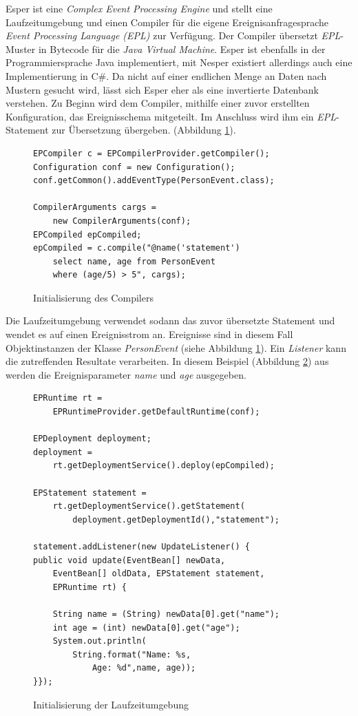 \documentclass{acm_proc_article-sp}
\begin{document}
Esper ist eine \textit{Complex Event Processing Engine} und stellt eine Laufzeitumgebung 
und einen Compiler für die eigene Ereignisanfragesprache \textit{Event Processing 
Language (EPL)} zur Verfügung. Der Compiler übersetzt \textit{EPL}-Muster in Bytecode für 
die 
\textit{Java Virtual Machine}. Esper ist ebenfalls in der Programmiersprache Java 
implementiert, mit Nesper existiert allerdings auch eine Implementierung in C\#. Da nicht 
auf einer endlichen Menge an Daten nach Mustern gesucht wird, lässt sich Esper eher als 
eine invertierte Datenbank verstehen. Zu Beginn wird dem Compiler, mithilfe einer 
zuvor erstellten Konfiguration, das Ereignisschema mitgeteilt. Im Anschluss wird ihm ein 
\textit{EPL}-Statement zur Übersetzung übergeben. (Abbildung 
\ref{java:01}). 

\begin{figure}[H]    
\begin{verbatim}
EPCompiler c = EPCompilerProvider.getCompiler();
Configuration conf = new Configuration();
conf.getCommon().addEventType(PersonEvent.class);

CompilerArguments cargs = 
    new CompilerArguments(conf);
EPCompiled epCompiled;
epCompiled = c.compile("@name('statement')
    select name, age from PersonEvent
    where (age/5) > 5", cargs);
\end{verbatim}

\caption{Initialisierung des Compilers}
\label{java:01}
\end{figure}

Die Laufzeitumgebung verwendet sodann das zuvor übersetzte Statement und wendet es auf 
einen Ereignisstrom an. Ereignisse sind in diesem Fall Objektinstanzen der Klasse 
\emph{PersonEvent} (siehe Abbildung \ref{java:01}). Ein \textit{Listener} kann die 
zutreffenden Resultate verarbeiten. In 
diesem Beispiel (Abbildung \ref{java:02}) aus \cite{esper-reference} werden die 
Ereignisparameter \textit{name} und \textit{age} ausgegeben.

\begin{figure}[H]    
\begin{verbatim}
EPRuntime rt =
    EPRuntimeProvider.getDefaultRuntime(conf);
    
EPDeployment deployment;
deployment =
    rt.getDeploymentService().deploy(epCompiled);
    
EPStatement statement =         
    rt.getDeploymentService().getStatement(
        deployment.getDeploymentId(),"statement");
        
statement.addListener(new UpdateListener() {
public void update(EventBean[] newData,
    EventBean[] oldData, EPStatement statement,
    EPRuntime rt) {
    
    String name = (String) newData[0].get("name");
    int age = (int) newData[0].get("age");
    System.out.println(
        String.format("Name: %s,
            Age: %d",name, age));
}});
\end{verbatim}
    \caption{Initialisierung der Laufzeitumgebung}
    \label{java:02}
\end{figure}
\end{document}
